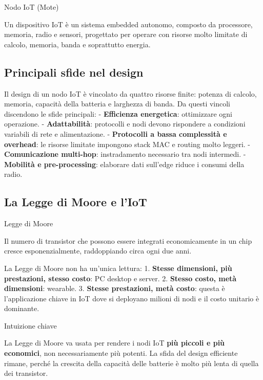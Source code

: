 \documentclass[
  italian,
  openany]{book}
\begin{document}
\begin{calloutdefinition}{Nodo IoT (Mote)}

Un dispositivo IoT è un sistema embedded autonomo, composto da
processore, memoria, radio e sensori, progettato per operare con risorse
molto limitate di calcolo, memoria, banda e soprattutto energia.

\end{calloutdefinition}

\subsection{Principali sfide nel
design}\label{principali-sfide-nel-design}

Il design di un nodo IoT è vincolato da quattro risorse finite: potenza
di calcolo, memoria, capacità della batteria e larghezza di banda. Da
questi vincoli discendono le sfide principali: - \textbf{Efficienza
energetica}: ottimizzare ogni operazione. - \textbf{Adattabilità}:
protocolli e nodi devono rispondere a condizioni variabili di rete e
alimentazione. - \textbf{Protocolli a bassa complessità e overhead}: le
risorse limitate impongono stack MAC e routing molto leggeri. -
\textbf{Comunicazione multi-hop}: instradamento necessario tra nodi
intermedi. - \textbf{Mobilità e pre-processing}: elaborare dati
sull'edge riduce i consumi della radio.

\subsection{La Legge di Moore e l'IoT}\label{la-legge-di-moore-e-liot}

\begin{calloutdefinition}{Legge di Moore}

Il numero di transistor che possono essere integrati economicamente in
un chip cresce esponenzialmente, raddoppiando circa ogni due anni.

\end{calloutdefinition}

La Legge di Moore non ha un'unica lettura: 1. \textbf{Stesse dimensioni,
più prestazioni, stesso costo}: PC desktop e server. 2. \textbf{Stesso
costo, metà dimensioni}: wearable. 3. \textbf{Stesse prestazioni, metà
costo}: questa è l'applicazione chiave in IoT dove si deployano milioni
di nodi e il costo unitario è dominante.

\begin{callouttip}{Intuizione chiave}

La Legge di Moore va usata per rendere i nodi IoT \textbf{più piccoli e
più economici}, non necessariamente più potenti. La sfida del design
efficiente rimane, perché la crescita della capacità delle batterie è
molto più lenta di quella dei transistor.

\end{callouttip}
\end{document}
